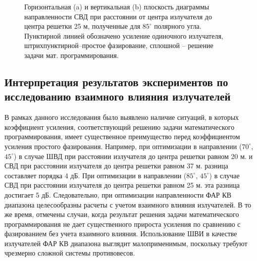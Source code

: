 \begin{figure}
\begin{minipage}[h]{0.49\linewidth}
\end{minipage}
\hfill
\begin{minipage}[h]{0.49\linewidth}
\end{minipage}
\caption{Горизонтальная (a) и вертикальная (b) плоскость диаграммы направленности СВД при расстоянии от центра излучателя до центра решетки 25 м, полученные для $85^{\circ}$ полярного угла. Пунктирной линией обозначено усиление одиночного излучателя, штрихпунктирной--простое фазирование, сплошной – решение задачи мат. программирования.}
\label{ris:bve_mut}
\end{figure}

\subsection{Интерпретация результатов экспериментов по исследованию взаимного влияния излучателей}
В рамках данного исследования было выявлено наличие ситуаций, в которых коэффициент усиления, соответствующий решению задачи математического программирования, имеет существенное преимущество перед коэффициентом усиления простого фазирования. Например, при оптимизации в направлении ($70^{\circ}$, $45^\circ$) в случае ШВД при расстоянии излучателя до центра решетки равном 20 м. и СВД при расстоянии излучателя до центра решетки равном 37 м. разница составляет порядка 4 дБ. При оптимизации в направлении ($85^\circ$, $45^{\circ}$) в случае СВД  при расстоянии излучателя до центра решетки равном 25 м. эта разница достигает 5 дБ. Следовательно, при оптимизации направленности ФАР КВ диапазона целесообразны расчеты с учетом взаимного влияния излучателей. В то же время, отмечены случаи, когда результат решения задачи математического программирования не дает существенного прироста усиления по сравнению с фазированием без учета взаимного влияния.
Использование ШВИ в качестве излучателей ФАР КВ диапазона выглядит малоприменимым, поскольку требуют чрезмерно сложной системы противовесов.
